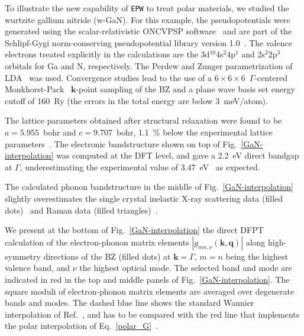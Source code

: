 \documentclass[final,3p,times,twocolumn]{elsarticle}
\begin{document}
To illustrate the new capability of \texttt{EPW} to treat polar materials, we studied the wurtzite gallium nitride (w-GaN).
For this example, the pseudopotentials were generated using the scalar-relativistic ONCVPSP software~\cite{Hamann2013} and are part of the Schlipf-Gygi norm-conserving pseudopotential library version 1.0~\cite{Schlipf2015}. The valence electrons treated explicitly in the calculations are the  3d$^{10}$4s$^2$4p$^1$  and 2s$^2$2p$^3$  orbitals for Ga and N, respectively.  The Perdew and Zunger parametrization of LDA~\cite{Perdew1981} was used.
Convergence studies lead to the use of a $6\times6\times6$~$\Gamma$-centered Monkhorst-Pack~\cite{Monkhorst1976} $\mathbf{k}$-point sampling of the BZ and a plane wave basis set energy cutoff of 160~Ry (the errors in the total energy are below 3~meV/atom). 

The lattice parameters obtained after structural relaxation were found to be $a = 5.955$~bohr and $c = 9.707$~bohr, 1.1~\% below the experimental lattice parameters~\cite{Bougrov2001}. 
The electronic bandstructure shown on top of Fig.~\ref{GaN-interpolation} was computed at the DFT level, and gave a 2.2~eV direct bandgap at $\Gamma$, underestimating the experimental value of 3.47~eV~\cite{Bougrov2001} as expected.



The calculated phonon bandstructure in the middle of Fig.~\ref{GaN-interpolation} slightly overestimates the single crystal inelastic X-ray scattering data (filled dots)~\cite{Ruf2001} and Raman data (filled triangles)~\cite{Siegle1997}.

We present at the bottom of Fig.~\ref{GaN-interpolation} the direct DFPT calculation of the electron-phonon matrix elements $|g_{mn,\nu}(\mathbf{k,q})|$ along high-symmetry directions of the BZ (filled dots) at $\mathbf{k}=\Gamma$, $m=n$ being the highest valence band, and $\nu$ the highest optical mode. The selected band and mode are indicated in red in the top and middle panels of Fig.~\ref{GaN-interpolation}. The square moduli of electron-phonon matrix elements are averaged over degenerate bands and modes. 
The dashed blue line shows the standard Wannier interpolation of Ref.~\cite{Giustino2007}, and has to be compared with the red line that implements the polar interpolation of Eq.~\eqref{polar_G}~\cite{Verdi2015}. 
\end{document}
